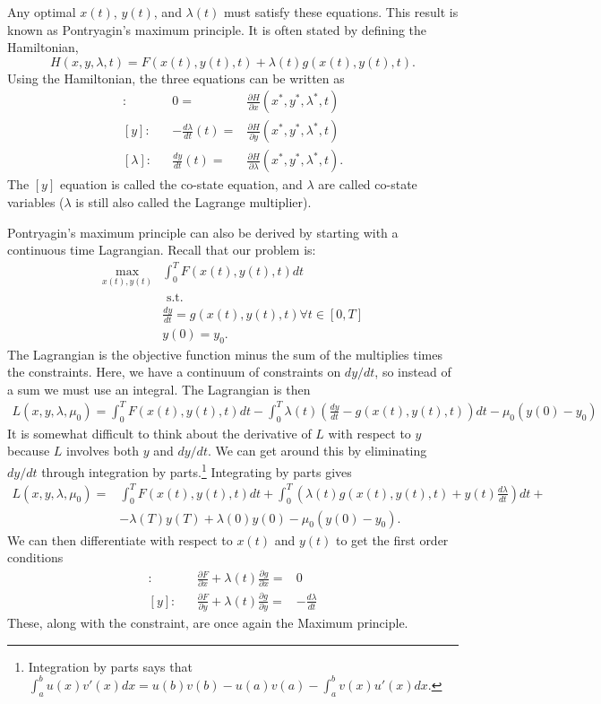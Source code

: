 Any optimal $x(t)$, $y(t)$, and $\lambda(t)$ must satisfy these
equations. This result is known as Pontryagin's maximum principle. It
is often stated by defining the Hamiltonian, 
\[ H(x,y,\lambda,t) = F(x(t),y(t),t) + \lambda(t) g(x(t),y(t),t). \]
Using the Hamiltonian, the three equations can be written as
\begin{align*}
  [x]: && 0 = & \frac{\partial H}{\partial x}(x^*,y^*,\lambda^*,t)
  \\
  [y]: && -\frac{d\lambda}{dt}(t) = & \frac{\partial H}{\partial y}(x^*,y^*,\lambda^*,t) \\
  [\lambda]: && \frac{dy}{dt}(t) = & \frac{\partial H}{\partial
    \lambda}(x^*,y^*,\lambda^*,t).
\end{align*}
The $[y]$ equation is called the co-state equation, and $\lambda$ are
called co-state variables ($\lambda$ is still also called the Lagrange
multiplier).

Pontryagin's maximum principle can also be derived by starting with a
continuous time Lagrangian. Recall that our problem is:
\begin{align*}
  \max_{x(t),y(t)} & \int_0^T F(x(t),y(t),t) dt \\
  & \text{ s.t.} \\
  & \frac{d y}{dt} = g(x(t),y(t),t) \forall t \in [0,T] \\ 
  & y(0) = y_0.
\end{align*}
The Lagrangian is the objective function minus the sum of the
multiplies times the constraints. Here, we have a continuum of
constraints on $dy/dt$, so instead of a sum we must use an
integral. The Lagrangian is then 
\begin{align*}
  L(x,y,\lambda,\mu_0) = \int_0^T F(x(t),y(t),t) dt - \int_0^T
  \lambda(t)\left( \frac{dy}{dt} - g(x(t),y(t),t) \right) dt - \mu_0
  (y(0) - y_0) 
\end{align*}
It is somewhat difficult to think about the derivative of $L$ with
respect to $y$ because $L$ involves both $y$ and $dy/dt$. We can get
around this by eliminating $dy/dt$ through integration by
parts.\footnote{Integration by parts says that $\int_a^b u(x) v'(x) dx
  = u(b)v(b) - u(a)v(a) - \int_a^b v(x) u'(x) dx$.} Integrating by
parts gives
\begin{align*}
  L(x,y,\lambda,\mu_0) = & \int_0^T F(x(t),y(t),t) dt +\int_0^T  \left(  
    \lambda(t) g(x(t),y(t),t) + y(t) \frac{d\lambda}{dt}\right)dt +
  \\ & -\lambda(T) y(T) + \lambda(0) y(0) - \mu_0
  (y(0) - y_0).
\end{align*} 
We can then differentiate with respect to $x(t)$ and $y(t)$ to get the
first order conditions
\begin{align*}
  [x]: && \frac{\partial F}{\partial x} + \lambda(t) \frac{\partial
    g}{\partial x} = &  0 \\
  [y]: && \frac{\partial F}{\partial y} + \lambda(t) \frac{\partial
    g}{\partial y} = &  -\frac{d\lambda}{dt}  
\end{align*}
These, along with the constraint, are once again the Maximum
principle. 

